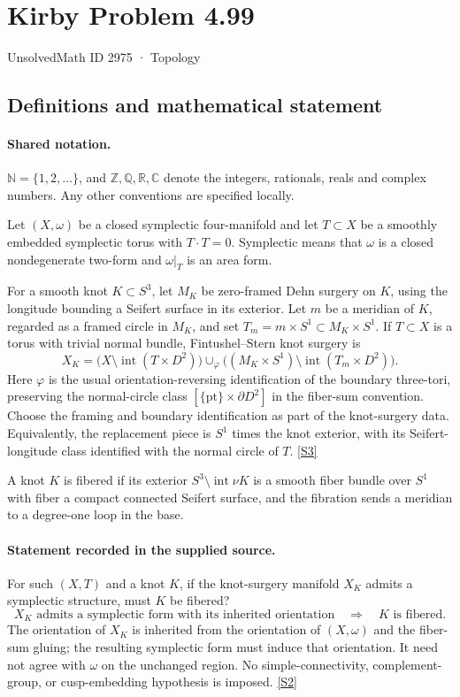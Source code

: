 \documentclass[11pt]{article}
\newcommand{\sref}[2]{\hyperlink{source:#1:#2}{[S#2]}}
\begin{document}
\setcounter{section}{2974}
\section{Kirby Problem 4.99}\label{2975}
{\small\sffamily UnsolvedMath ID 2975 · Topology}
\subsection{Definitions and mathematical statement}

\paragraph{Shared notation.}$\mathbb N=\{1,2,\ldots\}$, and $\mathbb Z,\mathbb Q,\mathbb R,\mathbb C$ denote the integers, rationals, reals and complex numbers. Any other conventions are specified locally.


Let $(X,\omega)$ be a closed symplectic four-manifold and let $T\subset X$ be a smoothly embedded symplectic torus with $T\cdot T=0$. Symplectic means that $\omega$ is a closed nondegenerate two-form and $\omega|_T$ is an area form. 

For a smooth knot $K\subset S^3$, let $M_K$ be zero-framed Dehn surgery on $K$, using the longitude bounding a Seifert surface in its exterior. Let $m$ be a meridian of $K$, regarded as a framed circle in $M_K$, and set $T_m=m\times S^1\subset M_K\times S^1$. If $T\subset X$ is a torus with trivial normal bundle, Fintushel--Stern knot surgery is
\[
X_K=\bigl(X\setminus\operatorname{int}(T\times D^2)\bigr)
\cup_\varphi\bigl((M_K\times S^1)\setminus\operatorname{int}(T_m\times D^2)\bigr).
\]
Here $\varphi$ is the usual orientation-reversing identification of the boundary three-tori, preserving the normal-circle class $[\{\mathrm{pt}\}\times\partial D^2]$ in the fiber-sum convention. Choose the framing and boundary identification as part of the knot-surgery data. Equivalently, the replacement piece is $S^1$ times the knot exterior, with its Seifert-longitude class identified with the normal circle of $T$. \sref{2975}{3}

A knot $K$ is fibered if its exterior $S^3\setminus\operatorname{int}\nu K$ is a smooth fiber bundle over $S^1$ with fiber a compact connected Seifert surface, and the fibration sends a meridian to a degree-one loop in the base.
\paragraph{Statement recorded in the supplied source.}
For such $(X,T)$ and a knot $K$, if the knot-surgery manifold $X_K$ admits a symplectic structure, must $K$ be fibered?
\[
 X_K\text{ admits a symplectic form with its inherited orientation}\quad\Longrightarrow\quad K\text{ is fibered}.
\]
The orientation of $X_K$ is inherited from the orientation of $(X,\omega)$ and the fiber-sum gluing; the resulting symplectic form must induce that orientation. It need not agree with $\omega$ on the unchanged region. No simple-connectivity, complement-group, or cusp-embedding hypothesis is imposed. \sref{2975}{2}
\end{document}
